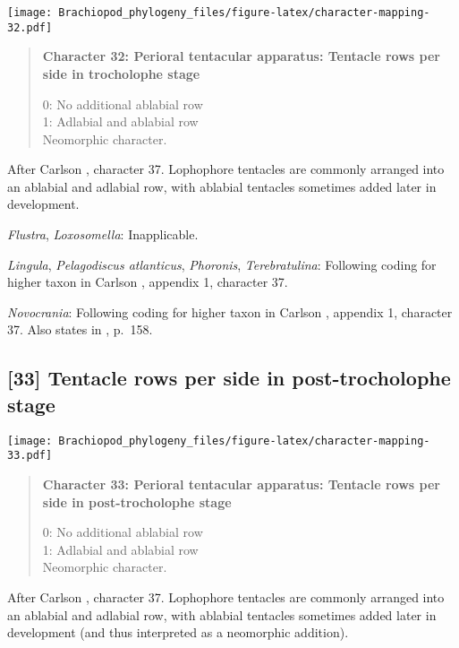 \documentclass[openany]{book}
\theoremstyle{definition}
\theoremstyle{definition}
\theoremstyle{definition}
\theoremstyle{remark}
\begin{document}
\texttt{[image: Brachiopod\_phylogeny\_files/figure-latex/character-mapping-32.pdf]}

\begin{quote}
\textbf{Character 32: Perioral tentacular apparatus: Tentacle rows per
side in trocholophe stage}

0: No additional ablabial row\\
1: Adlabial and ablabial row\\
Neomorphic character.
\end{quote}

After Carlson \citeyearpar{Carlson1995Phylogeneticrelationships},
character 37. Lophophore tentacles are commonly arranged into an
ablabial and adlabial row, with ablabial tentacles sometimes added later
in development.

\hypertarget{Flustra-coding-32}{}
\emph{Flustra}, \emph{Loxosomella}: Inapplicable.

\hypertarget{Lingula-coding-32}{}
\emph{Lingula}, \emph{Pelagodiscus atlanticus}, \emph{Phoronis},
\emph{Terebratulina}: Following coding for higher taxon in Carlson
\citeyearpar{Carlson1995Phylogeneticrelationships}, appendix 1,
character 37.

\hypertarget{Novocrania-coding-32}{}
\emph{Novocrania}: Following coding for higher taxon in Carlson
\citeyearpar{Carlson1995Phylogeneticrelationships}, appendix 1,
character 37. Also states in
\citet{Williams2000LinguliformeaCraniiformea}, p.~158.

\subsection*{{[}33{]} Tentacle rows per side in post-trocholophe
stage}\label{tentacle-rows-per-side-in-post-trocholophe-stage}

\texttt{[image: Brachiopod\_phylogeny\_files/figure-latex/character-mapping-33.pdf]}

\begin{quote}
\textbf{Character 33: Perioral tentacular apparatus: Tentacle rows per
side in post-trocholophe stage}

0: No additional ablabial row\\
1: Adlabial and ablabial row\\
Neomorphic character.
\end{quote}

After Carlson \citeyearpar{Carlson1995Phylogeneticrelationships},
character 37. Lophophore tentacles are commonly arranged into an
ablabial and adlabial row, with ablabial tentacles sometimes added later
in development (and thus interpreted as a neomorphic addition).
\end{document}

